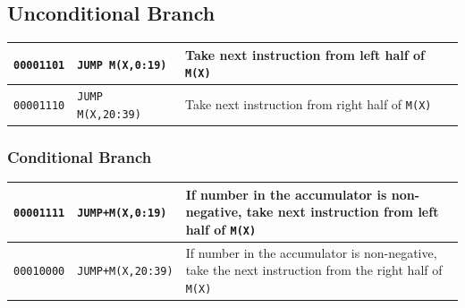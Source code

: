 \subsection{Unconditional Branch}
\begin{table}[H]
    \centering
    \begin{tabularx}{\textwidth}{XXX}
        \hline
        \texttt{00001101} & \texttt{JUMP M(X,0:19)} & Take next instruction from left half of \texttt{M(X)}\\
        \hline
        \texttt{00001110} & \texttt{JUMP M(X,20:39)} & Take next instruction from right half of \texttt{M(X)}\\
        \hline
    \end{tabularx}
\end{table}

\subsubsection{Conditional Branch}
\begin{table}[H]
    \centering
    \begin{tabularx}{\textwidth}{XXX}
        \hline
        \texttt{00001111} & \texttt{JUMP+M(X,0:19)} & If number in the accumulator is non-negative, take next instruction from left half of \texttt{M(X)}\\
        \hline
        \texttt{00010000} & \texttt{JUMP+M(X,20:39)} & If number in the accumulator is non-negative, take the next instruction from the right half of \texttt{M(X)}\\
        \hline
    \end{tabularx}
\end{table}

